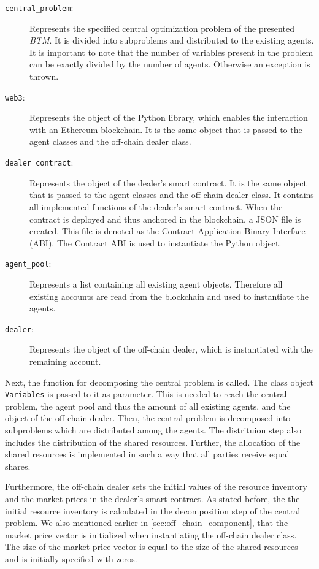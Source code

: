 \begin{description}
	\item[\texttt{central\_problem}:] Represents the specified central optimization problem of the presented \textit{BTM}.
    It is divided into subproblems and distributed to the existing agents. It is important 
    to note that the number of variables present in the problem can be exactly divided by the number of agents.
    Otherwise an exception is thrown.
	\item[\texttt{web3}:] Represents the object of the Python library, which enables the interaction with an
	Ethereum blockchain. It is the same object that is passed to the agent classes and the off-chain dealer class.
    \item[\texttt{dealer\_contract}:] Represents the object of the dealer's smart contract. 
    It is the same object that is passed to the agent classes and the off-chain dealer class. It contains all
    implemented functions of the dealer's smart contract. When the contract is deployed and thus anchored in the blockchain, a JSON file is created. 
    This file is denoted as the Contract Application Binary Interface (ABI). The Contract ABI is used to instantiate the Python object.  
    \item[\texttt{agent\_pool}:] Represents a list containing all existing agent objects. 
    Therefore all existing accounts are read from the blockchain and used to instantiate the agents.
    \item[\texttt{dealer}:] Represents the object of the off-chain dealer, which is instantiated with the 
    remaining account.
\end{description}

Next, the function for decomposing the central problem is called. The class object \verb|Variables| is passed to it as parameter.
This is needed to reach the central problem, the agent pool and thus the amount of all existing agents, and the object of the
off-chain dealer. 
Then, the central problem is decomposed into subproblems which are distributed among the agents. 
The distrituion step also includes the distribution of the shared resources. 
Further, the allocation of the shared resources is implemented in such a way that all parties receive equal shares.

Furthermore, the off-chain dealer sets the initial values of the resource inventory and the market prices in the dealer's
smart contract. As stated before, the the initial resource inventory is calculated in the decomposition step of the central problem. 
We also mentioned earlier in \ref{sec:off_chain_component}, that the market price vector is initialized when instantiating the off-chain dealer class.
The size of the market price vector is equal to the size of the shared resources and is initially specified with zeros.

